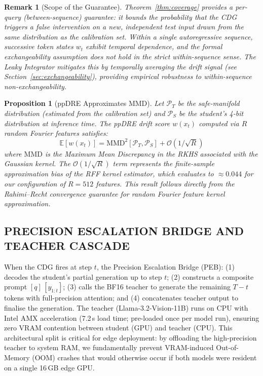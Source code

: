 \documentclass{ieeetmlcn}
\newtheorem{proposition}{Proposition}
\newtheorem{remark}{Remark}
\begin{document}
\begin{remark}[Scope of the Guarantee]
Theorem~\ref{thm:coverage} provides a \emph{per-query} (between-sequence) guarantee: it bounds the probability that the CDG triggers a false intervention on a new, independent test input drawn from the same distribution as the calibration set. Within a single autoregressive sequence, successive token states $w_t$ exhibit temporal dependence, and the formal exchangeability assumption does not hold in the strict within-sequence sense. The Leaky Integrator mitigates this by temporally averaging the drift signal (see Section~\ref{sec:exchangeability}), providing empirical robustness to within-sequence non-exchangeability.
\end{remark}
 
 \begin{proposition}[ppDRE Approximates MMD]
 \label{thm:mmd}
 Let $\mathcal{P}_T$ be the safe-manifold distribution (estimated from the calibration set) and $\mathcal{P}_S$ be the student's 4-bit distribution at inference time. The ppDRE drift score $w(x_t)$ computed via $R$ random Fourier features \cite{rahimi2007random} satisfies:
 \begin{equation}
   \mathbb{E}[w(x_t)] = \text{MMD}^2[\mathcal{P}_T, \mathcal{P}_S] + \mathcal{O}(1/\sqrt{R})
 \end{equation}
 where $\text{MMD}$ is the Maximum Mean Discrepancy in the RKHS associated with the Gaussian kernel. The $\mathcal{O}(1/\sqrt{R})$ term represents the finite-sample approximation bias of the RFF kernel estimator, which evaluates to $\approx 0.044$ for our configuration of $R=512$ features. This result follows directly from the Rahimi--Recht convergence guarantee for random Fourier feature kernel approximation.
 \end{proposition}


\subsection{PRECISION ESCALATION BRIDGE AND TEACHER CASCADE}
When the CDG fires at step $t$, the Precision Escalation Bridge (PEB):
(1) decodes the student's partial generation up to step $t$; (2)
constructs a composite prompt $[q]\,[y_{1:t}]$; (3) calls the BF16
teacher to generate the remaining $T-t$ tokens with full-precision
attention; and (4) concatenates teacher output to finalise the
generation. The teacher (Llama-3.2-Vision-11B) runs on CPU with Intel
AMX acceleration (7.2\,s load time; pre-loaded once per model run),
ensuring zero VRAM contention between student (GPU) and teacher (CPU). This architectural split is critical for edge deployment: by offloading the high-precision teacher to system RAM, we fundamentally prevent VRAM-induced Out-of-Memory (OOM) crashes that would otherwise occur if both models were resident on a single 16\,GB edge GPU.
\end{document}
